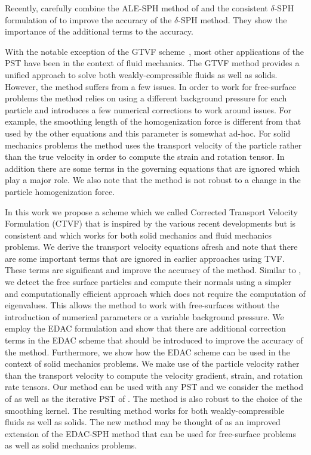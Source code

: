 \documentclass[preprint,12pt]{elsarticle}
\begin{document}
Recently, \citet{antuono2021delta} carefully combine the ALE-SPH method of
\citet{oger_ale_sph_2016} and the consistent $\delta$-SPH formulation of
\citet{sun_consistent_2019} to improve the accuracy of the $\delta$-SPH
method. They show the importance of the additional terms to the accuracy.

With the notable exception of the GTVF scheme~\cite{zhang_hu_adams17}, most
other applications of the PST have been in the context of fluid mechanics. The
GTVF method provides a unified approach to solve both weakly-compressible
fluids as well as solids. However, the method suffers from a few issues. In
order to work for free-surface problems the method relies on using a different
background pressure for each particle and introduces a few numerical
corrections to work around issues. For example, the smoothing length of the
homogenization force is different from that used by the other equations and
this parameter is somewhat ad-hoc. For solid mechanics problems the method
uses the transport velocity of the particle rather than the true velocity in
order to compute the strain and rotation tensor. In addition there are some
terms in the governing equations that are ignored which play a major role. We
also note that the method is not robust to a change in the particle
homogenization force.

In this work we propose a scheme which we called Corrected Transport Velocity
Formulation (CTVF) that is inspired by the various recent developments but is
consistent and which works for both solid mechanics and fluid mechanics
problems. We derive the transport velocity equations afresh and note that
there are some important terms that are ignored in earlier approaches using
TVF. These terms are significant and improve the accuracy of the method.
Similar to \cite{oger_ale_sph_2016,sun_consistent_2019}, we detect the free
surface particles and compute their normals using a simpler and
computationally efficient approach which does not require the computation of
eigenvalues. This allows the method to work with free-surfaces without the
introduction of numerical parameters or a variable background pressure. We
employ the EDAC formulation and show that there are additional correction
terms in the EDAC scheme that should be introduced to improve the accuracy of
the method. Furthermore, we show how the EDAC scheme can be used in the
context of solid mechanics problems. We make use of the particle velocity
rather than the transport velocity to compute the velocity gradient, strain,
and rotation rate tensors. Our method can be used with any PST and we consider
the method of \citet{sun_consistent_2019} as well as the iterative PST of
\citet{huang_kernel_2019}. The method is also robust to the choice of the
smoothing kernel. The resulting method works for both weakly-compressible
fluids as well as solids. The new method may be thought of as an improved
extension of the EDAC-SPH method that can be used for free-surface problems as
well as solid mechanics problems.
\end{document}
